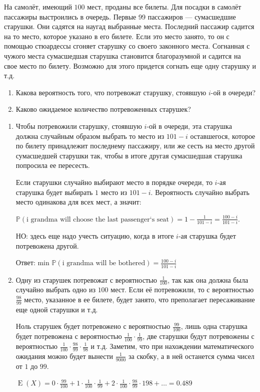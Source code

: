 \documentclass[nobib]{tufte-handout}
\theoremstyle{definition}
\newcounter{problem}
\newenvironment{problem}%
{%
\refstepcounter{problem}%
     \hypertarget{problem:{\theproblem}}{}
     \Writetofile{solution_file}{\protect\hypertarget{soln:\theproblem}{}}
     \begin{myenum}[label=\bfseries\protect\hyperlink{soln:\theproblem}{\theproblem},ref=\theproblem]
     \item%
    }%
    {%
    \end{myenum}}
\DeclareMathOperator{\E}{E}
\renewcommand{\P}{\mathbb{P}}
\begin{document}
\begin{problem}
На самолёт, имеющий $100$ мест, проданы все билеты. Для посадки в
самолёт пассажиры выстроились в очередь. Первые 99 пассажиров — сумасшедшие старушки.
Они садятся на наугад выбранные места. Последний пассажир садится на то место,
которое указано в его билете. Если это место занято, то он с
помощью стюардессы сгоняет старушку со своего законного места.
Согнанная с чужого места сумасшедшая старушка становится
благоразумной и садится на свое место по билету. Возможно для
этого придется согнать еще одну старушку и т.д.
\begin{enumerate}
\item Какова вероятность того, что потревожат старушку, стоявшую $i$-ой в очереди?
\item Каково ожидаемое количество потревоженных старушек?
\end{enumerate}

\begin{sol}
\begin{enumerate}
\item Чтобы потревожили старушку, стоявшую $i$-ой в очереди,
эта старушка должна случайным образом выбрать то место из $101-i$ оставшегося,
которое по билету принадлежит последнему пассажиру,
или же сесть на место другой сумасшедшей старушки так,
чтобы в итоге другая сумасшедшая старушка попросила ее пересесть.

Если старушки случайно выбирают место в порядке очереди,
то $i$-ая старушка будет выбирать $1$ место из $101-i$.
Вероятность случайно выбрать место одинакова для всех мест, а значит:

$\P(\text{i grandma will choose the last passenger`s seat})=1 - \frac{1}{101-i} =
 \frac{100-i}{101-i}$.

НО: здесь еще надо учесть ситуацию, когда в итоге $i$-ая старушка будет потревожена другой.

Ответ: min $\P(\text{i grandma will be bothered}) =\frac{100-i}{101-i}$

\item Одну из старушек потревожат с вероятностью $\frac{1}{100}$,
так как она должна была случайно выбрать одно из $100$ мест.
Если её потревожили, то с вероятностью $\frac{98}{99}$ место, указанное в ее билете,
будет занято, что преполагает пересаживание еще одной старушки и т.д.

Ноль старушек будет потревожено с вероятностью $\frac{99}{100}$,
лишь одна старушка будет потревожена с вероятностью $\frac{1}{100} \cdot \frac{1}{99}$,
две старушки будут потревожены с вероятностью
$\frac{1}{100} \cdot \frac{98}{99} \cdot \frac{1}{98}$ и т.д.
Заметим, что при нахождении математического ожидания
можно будет вынести $\frac{1}{9000}$ за скобку, а в ней останется
сумма чисел  от $1$ до $99$.

$\E(X) = 0 \cdot \frac{99}{100} + 1 \cdot \frac{1}{100} \cdot \frac{1}{99} +
2\cdot \frac{1}{100} \cdot \frac{98}{99} \cdot {1}{98} + \ldots  = 0.489$
\end{enumerate}
\end{sol}

\end{problem}
\end{document}
